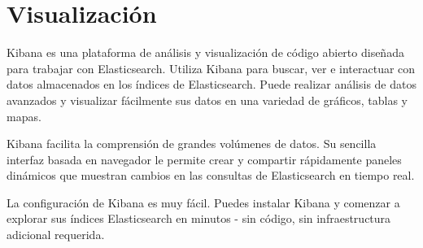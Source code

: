 \section{Visualización}
Kibana es una plataforma de análisis y visualización de código abierto diseñada para trabajar con Elasticsearch. Utiliza Kibana para buscar, ver e interactuar con datos almacenados en los índices de Elasticsearch. Puede realizar análisis de datos avanzados y visualizar fácilmente sus datos en una variedad de gráficos, tablas y mapas.

Kibana facilita la comprensión de grandes volúmenes de datos. Su sencilla interfaz basada en navegador le permite crear y compartir rápidamente paneles dinámicos que muestran cambios en las consultas de Elasticsearch en tiempo real.

La configuración de Kibana es muy fácil. Puedes instalar Kibana y comenzar a explorar sus índices Elasticsearch en minutos - sin código, sin infraestructura adicional requerida.

